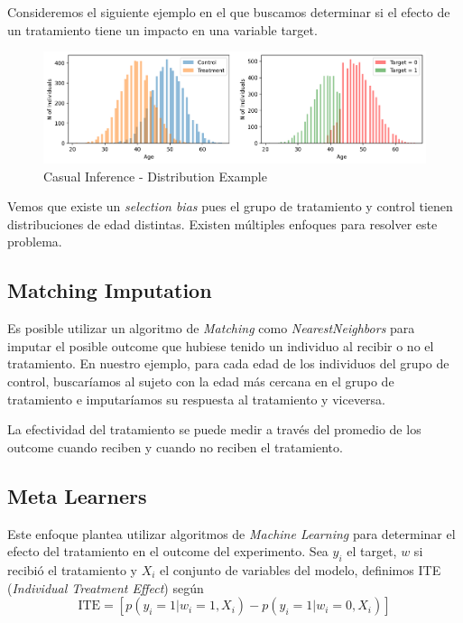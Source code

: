 Consideremos el siguiente ejemplo en el que buscamos determinar si el efecto de un tratamiento tiene un impacto en una variable target. 

\begin{figure}[H]
    \center
    \includegraphics[scale=0.5]{notebooks/STATS/img/causal_inference_age_distribution.png}
    \caption{Casual Inference - Distribution Example}
\end{figure}

Vemos que existe un \textit{selection bias} pues el grupo de tratamiento y control tienen distribuciones de edad distintas. Existen múltiples enfoques para resolver este problema. 

\subsection{Matching Imputation}

Es posible utilizar un algoritmo de \textit{Matching} como \textit{NearestNeighbors} para imputar el posible outcome que hubiese tenido un individuo al recibir o no el tratamiento. En nuestro ejemplo, para cada edad de los individuos del grupo de control, buscaríamos al sujeto con la edad más cercana en el grupo de tratamiento e imputaríamos su respuesta al tratamiento y viceversa. 

La efectividad del tratamiento se puede medir a través del promedio de los outcome cuando reciben y cuando no reciben el tratamiento. 

\subsection{Meta Learners}

Este enfoque plantea utilizar algoritmos de \textit{Machine Learning} para determinar el efecto del tratamiento en el outcome del experimento. Sea $y_i$ el target, $w$ si recibió el tratamiento y $X_i$ el conjunto de variables del modelo, definimos ITE (\textit{Individual Treatment Effect}) según 
$$
\text{ITE} = \left [ p(y_i = 1 | w_i = 1, X_i) - p(y_i = 1 | w_i = 0, X_i) \right ]
$$

